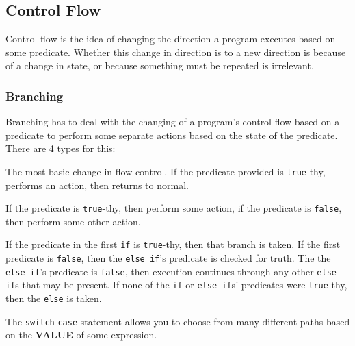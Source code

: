 \subsection{Control Flow}\label{subsec:Control_Flow}
Control flow is the idea of changing the direction a program executes based on some predicate.
Whether this change in direction is to a new direction is because of a change in state, or because something must be repeated is irrelevant.

\subsubsection{Branching}\label{subsubsec:Branching}
Branching has to deal with the changing of a program's control flow based on a predicate to perform some separate actions based on the state of the predicate.
There are 4 types for this:
\begin{description}[noitemsep]
\item[\nameref{par:if_Statement}] The most basic change in flow control.
  If the predicate provided is \texttt{true}-thy, performs an action, then returns to normal.

\item[\nameref{par:if_else_Statement}] If the predicate is \texttt{true}-thy, then perform some action, if the predicate is \texttt{false}, then perform some other action.

\item[\nameref{par:if_elseif_else_Statement}] If the predicate in the first \texttt{if} is \texttt{true}-thy, then that branch is taken.
  If the first predicate is \texttt{false}, then the \texttt{else if}'s predicate is checked for truth.
  The the \texttt{else if}'s predicate is \texttt{false}, then execution continues through any other \texttt{else if}s that may be present.
  If none of the \texttt{if} or \texttt{else if}s' predicates were \texttt{true}-thy, then the \texttt{else} is taken.
\item[\nameref{par:switch_case_Statement}] The \texttt{switch}-\texttt{case} statement allows you to choose from many different paths based on the \textbf{VALUE} of some expression.
\end{description}


